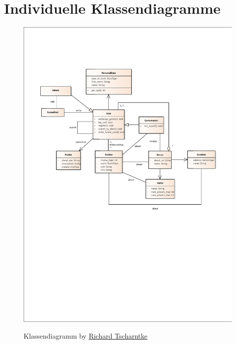 \section{Individuelle Klassendiagramme}
	\label{app:C_Klassendiagramme}
	\begin{figure}[h!]
		\centering
		\includegraphics[width = \linewidth]{docs/5_Klassendiagramme/Richard/classdiagram_richard.pdf}
		\label{fig:ClassDia_Richard}
		\caption*{Klassendiagramm by \hyperref[person:RichardTscharntke]{Richard Tscharntke}}
	\end{figure}

